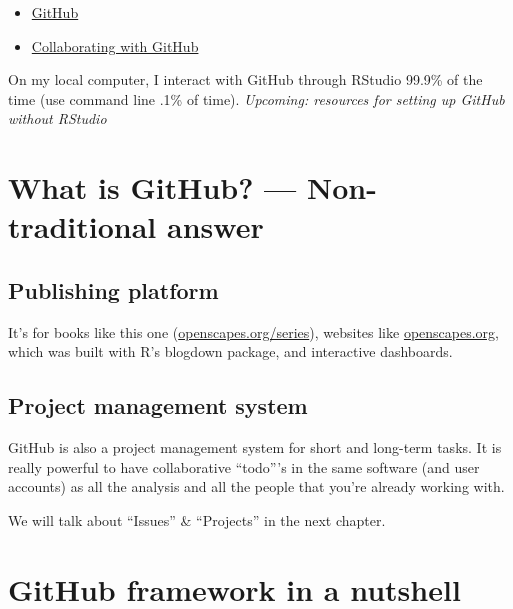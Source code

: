 \documentclass[
  letterpaper,
  DIV=11,
  numbers=noendperiod]{scrreprt}
\providecommand{\tightlist}{%
  \setlength{\itemsep}{0pt}\setlength{\parskip}{0pt}}
\begin{document}
\begin{itemize}
\tightlist
\item
  \href{http://ohi-science.org/data-science-training/github.html}{GitHub}
\item
  \href{http://ohi-science.org/data-science-training/collaborating.html}{Collaborating
  with GitHub}
\end{itemize}

On my local computer, I interact with GitHub through RStudio 99.9\% of
the time (use command line .1\% of time). \emph{Upcoming: resources for
setting up GitHub without RStudio}

\hypertarget{what-is-github-non-traditional-answer}{%
\section{What is GitHub? --- Non-traditional
answer}\label{what-is-github-non-traditional-answer}}

\hypertarget{publishing-platform}{%
\subsection{Publishing platform}\label{publishing-platform}}

It's for books like this one
(\href{https://openscapes.org/series}{openscapes.org/series}), websites
like \href{https://openscapes.org}{openscapes.org}, which was built with
R's blogdown package, and interactive dashboards.

\hypertarget{project-management-system}{%
\subsection{Project management system}\label{project-management-system}}

GitHub is also a project management system for short and long-term
tasks. It is really powerful to have collaborative ``todo'''s in the
same software (and user accounts) as all the analysis and all the people
that you're already working with.

We will talk about ``Issues'' \& ``Projects'' in the next chapter.

\hypertarget{github-framework-in-a-nutshell}{%
\section{GitHub framework in a
nutshell}\label{github-framework-in-a-nutshell}}
\end{document}
